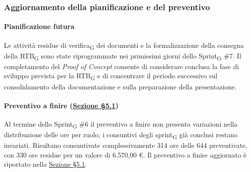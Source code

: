 \documentclass[a4paper, 10pt, colorlinks=true, linkcolor=black, urlcolor=blue, citecolor=blue, hidelinks]{article}
\begin{document}
\subsubsection{Aggiornamento della pianificazione e del preventivo}

\paragraph{Pianificazione futura}
Le attività residue di verifica\textsubscript{G} dei documenti e la formalizzazione della consegna della RTB\textsubscript{G} sono state riprogrammate nei primissimi giorni dello Sprint\textsubscript{G} \#7. Il completamento del \textit{Proof of Concept} consente di considerare conclusa la fase di sviluppo prevista per la RTB\textsubscript{G} e di concentrare il periodo successivo sul consolidamento della documentazione e sulla preparazione della presentazione.

\paragraph{Preventivo a finire (\hyperref[tab:preventivo-finire]{Sezione \S5.1})}
Al termine dello Sprint\textsubscript{G} \#6 il preventivo a finire non presenta variazioni nella distribuzione delle ore per ruolo; i consuntivi degli sprint\textsubscript{G} già conclusi restano invariati. Risultano consuntivate complessivamente 314 ore delle 644 preventivate, con 330 ore residue per un valore di 6.570,00 €. Il preventivo a finire aggiornato è riportato nella \hyperref[tab:preventivo-finire]{Sezione \S5.1}.
\end{document}
